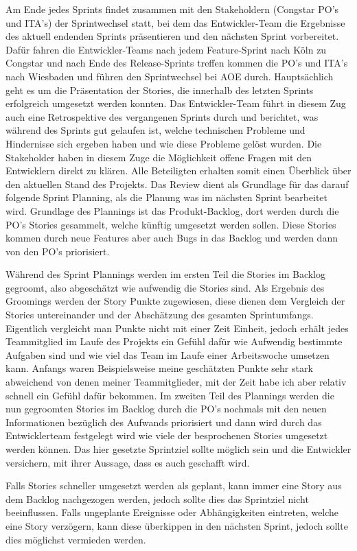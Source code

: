 \documentclass[11pt,a4paper]{article} %
\begin{document}
Am Ende jedes Sprints findet zusammen mit den Stakeholdern (Congstar PO's und ITA's) der Sprintwechsel statt, bei dem das Entwickler-Team die Ergebnisse des aktuell endenden Sprints präsentieren und den nächsten Sprint vorbereitet.
Dafür fahren die Entwickler-Teams nach jedem Feature-Sprint nach Köln zu Congstar und nach Ende des Release-Sprints treffen kommen die PO's und ITA's nach Wiesbaden und führen den Sprintwechsel bei AOE durch.
Hauptsächlich geht es um die Präsentation der Stories, die innerhalb des letzten Sprints erfolgreich umgesetzt werden konnten.
Das Entwickler-Team führt in diesem Zug auch eine Retrospektive des vergangenen Sprints durch und berichtet, was während des Sprints gut gelaufen ist, welche technischen Probleme und Hindernisse sich ergeben haben und wie diese Probleme gelöst wurden.
Die Stakeholder haben in diesem Zuge die Möglichkeit offene Fragen mit den Entwicklern direkt zu klären. Alle Beteiligten erhalten somit einen Überblick über den aktuellen Stand des Projekts.
Das Review dient als Grundlage für das darauf folgende Sprint Planning, als die Planung was im nächsten Sprint bearbeitet wird.
Grundlage des Plannings ist das Produkt-Backlog, dort werden durch die PO's Stories gesammelt, welche künftig umgesetzt werden sollen.
Diese Stories kommen durch neue Features aber auch Bugs in das Backlog und werden dann von den PO's  priorisiert.

Während des Sprint Plannings werden im ersten Teil die Stories im Backlog gegroomt, also abgeschätzt wie aufwendig die Stories sind.
Als Ergebnis des Groomings werden der Story Punkte zugewiesen, diese dienen dem Vergleich der Stories untereinander und der Abschätzung des gesamten Sprintumfangs. Eigentlich vergleicht man Punkte nicht mit einer Zeit Einheit, jedoch erhält jedes Teammitglied im Laufe des Projekts ein Gefühl dafür wie Aufwendig bestimmte Aufgaben sind und wie viel das Team im Laufe einer Arbeitswoche umsetzen kann. Anfangs waren Beispielsweise meine geschätzten Punkte sehr stark abweichend von denen meiner Teammitglieder, mit der Zeit habe ich aber relativ schnell ein Gefühl dafür bekommen.
Im zweiten Teil des Plannings werden die nun gegroomten Stories im Backlog durch die PO's nochmals mit den neuen Informationen bezüglich des Aufwands priorisiert und dann wird durch das Entwicklerteam festgelegt wird wie viele der besprochenen Stories umgesetzt werden können. Das hier gesetzte Sprintziel sollte möglich sein und die Entwickler versichern, mit ihrer Aussage, dass es auch geschafft wird.

Falls Stories schneller umgesetzt werden als geplant, kann immer eine Story aus dem Backlog nachgezogen werden, jedoch sollte dies das Sprintziel nicht beeinflussen. Falls ungeplante Ereignisse oder Abhängigkeiten eintreten, welche eine Story verzögern, kann diese überkippen in den nächsten Sprint, jedoch sollte dies möglichst vermieden werden.
\end{document}
